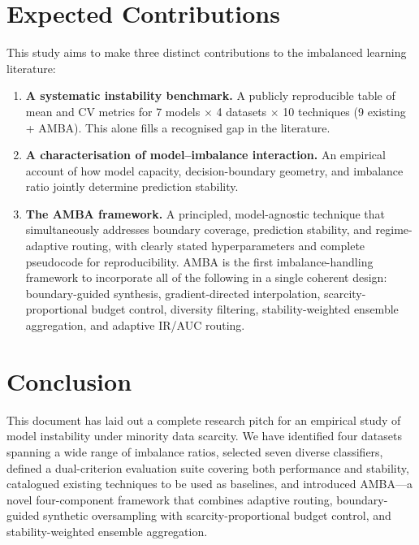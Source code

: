 \documentclass[11pt,a4paper]{article}
\begin{document}
\section{Expected Contributions}

This study aims to make three distinct contributions to the imbalanced learning literature:

\begin{enumerate}[itemsep=6pt]
  \item \textbf{A systematic instability benchmark.} A publicly reproducible table of mean
        and CV metrics for 7 models $\times$ 4 datasets $\times$ 10 techniques
        (9 existing + AMBA). This alone fills a recognised gap in the literature.

  \item \textbf{A characterisation of model--imbalance interaction.} An empirical account of
        how model capacity, decision-boundary geometry, and imbalance ratio jointly determine
        prediction stability.

  \item \textbf{The AMBA framework.} A principled, model-agnostic technique that
        simultaneously addresses boundary coverage, prediction stability, and regime-adaptive
        routing, with clearly stated hyperparameters and complete pseudocode for
        reproducibility. AMBA is the first imbalance-handling framework to incorporate all
        of the following in a single coherent design: boundary-guided synthesis,
        gradient-directed interpolation, scarcity-proportional budget control, diversity
        filtering, stability-weighted ensemble aggregation, and adaptive IR/AUC routing.
\end{enumerate}

\section{Conclusion}

This document has laid out a complete research pitch for an empirical study of model
instability under minority data scarcity. We have identified four datasets spanning a wide
range of imbalance ratios, selected seven diverse classifiers, defined a dual-criterion
evaluation suite covering both performance and stability, catalogued existing techniques to
be used as baselines, and introduced AMBA---a novel four-component framework that
combines adaptive routing, boundary-guided synthetic oversampling with scarcity-proportional
budget control, and stability-weighted ensemble aggregation.
\end{document}
